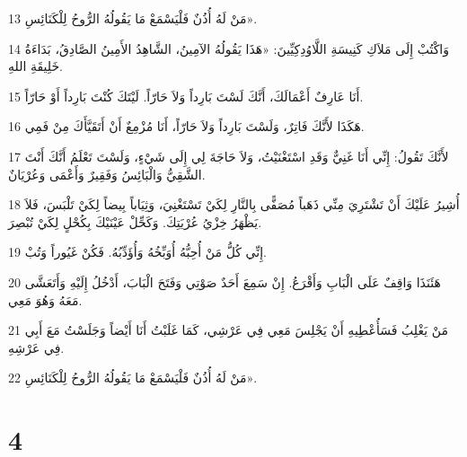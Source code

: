 \par 13 مَنْ لَهُ أُذُنٌ فَلْيَسْمَعْ مَا يَقُولُهُ الرُّوحُ لِلْكَنَائِسِ».
\par 14 وَاكْتُبْ إِلَى مَلاَكِ كَنِيسَةِ اللَّاوُدِكِيِّينَ: «هَذَا يَقُولُهُ الآمِينُ، الشَّاهِدُ الأَمِينُ الصَّادِقُ، بَدَاءَةُ خَلِيقَةِ اللهِ.
\par 15 أَنَا عَارِفٌ أَعْمَالَكَ، أَنَّكَ لَسْتَ بَارِداً وَلاَ حَارّاً. لَيْتَكَ كُنْتَ بَارِداً أَوْ حَارّاً.
\par 16 هَكَذَا لأَنَّكَ فَاتِرٌ، وَلَسْتَ بَارِداً وَلاَ حَارّاً، أَنَا مُزْمِعٌ أَنْ أَتَقَيَّأَكَ مِنْ فَمِي.
\par 17 لأَنَّكَ تَقُولُ: إِنِّي أَنَا غَنِيٌّ وَقَدِ اسْتَغْنَيْتُ، وَلاَ حَاجَةَ لِي إِلَى شَيْءٍ، وَلَسْتَ تَعْلَمُ أَنَّكَ أَنْتَ الشَّقِيُّ وَالْبَائِسُ وَفَقِيرٌ وَأَعْمَى وَعُرْيَانٌ.
\par 18 أُشِيرُ عَلَيْكَ أَنْ تَشْتَرِيَ مِنِّي ذَهَباً مُصَفًّى بِالنَّارِ لِكَيْ تَسْتَغْنِيَ، وَثِيَاباً بِيضاً لِكَيْ تَلْبَسَ، فَلاَ يَظْهَرُ خِزْيُ عُرْيَتِكَ. وَكَحِّلْ عَيْنَيْكَ بِكُحْلٍ لِكَيْ تُبْصِرَ.
\par 19 إِنِّي كُلُّ مَنْ أُحِبُّهُ أُوَبِّخُهُ وَأُؤَدِّبُهُ. فَكُنْ غَيُوراً وَتُبْ.
\par 20 هَئَنَذَا وَاقِفٌ عَلَى الْبَابِ وَأَقْرَعُ. إِنْ سَمِعَ أَحَدٌ صَوْتِي وَفَتَحَ الْبَابَ، أَدْخُلُ إِلَيْهِ وَأَتَعَشَّى مَعَهُ وَهُوَ مَعِي.
\par 21 مَنْ يَغْلِبُ فَسَأُعْطِيهِ أَنْ يَجْلِسَ مَعِي فِي عَرْشِي، كَمَا غَلَبْتُ أَنَا أَيْضاً وَجَلَسْتُ مَعَ أَبِي فِي عَرْشِهِ.
\par 22 مَنْ لَهُ أُذُنٌ فَلْيَسْمَعْ مَا يَقُولُهُ الرُّوحُ لِلْكَنَائِسِ».

\chapter{4}

